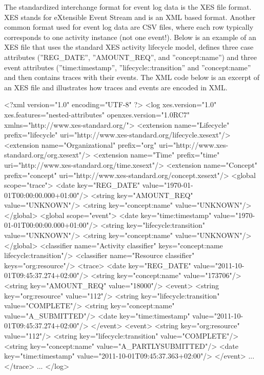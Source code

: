 The standardized interchange format for event log data is the XES file format. XES stands for eXtensible Event Stream and is an XML based format. Another common format used for event log data are CSV files, where each row typically corresponds to one activity instance (not one event!). Below is an example of an XES file that uses the standard XES activity lifecycle model, defines three case attributes (''REG\_DATE'', ''AMOUNT\_REQ'', and ''concept:name'') and three event attributes (''time:timestamp'', ''lifecycle::transition'' and ''concept:name'' and then contains traces with their events. The XML code below is an excerpt of an XES file and illustrates how traces and events are encoded in XML.

\begin{xmlcode}
<?xml version="1.0" encoding="UTF-8" ?>
<log xes.version="1.0" xes.features="nested-attributes" 
    openxes.version="1.0RC7" 
    xmlns="http://www.xes-standard.org/">
  <extension name="Lifecycle" prefix="lifecycle" 
    uri="http://www.xes-standard.org/lifecycle.xesext"/>
  <extension name="Organizational" prefix="org" 
    uri="http://www.xes-standard.org/org.xesext"/>
  <extension name="Time" prefix="time" 
    uri="http://www.xes-standard.org/time.xesext"/>
  <extension name="Concept" prefix="concept" 
    uri="http://www.xes-standard.org/concept.xesext"/>
  <global scope="trace">
    <date key="REG_DATE" value="1970-01-01T00:00:00.000+01:00"/>
    <string key="AMOUNT_REQ" value="UNKNOWN"/>
    <string key="concept:name" value="UNKNOWN"/>
  </global>
  <global scope="event">
    <date key="time:timestamp" value="1970-01-01T00:00:00.000+01:00"/>
    <string key="lifecycle:transition" value="UNKNOWN"/>
    <string key="concept:name" value="UNKNOWN"/>
  </global>
  <classifier name="Activity classifier" 
     keys="concept:name lifecycle:transition"/>
  <classifier name="Resource classifier" 
     keys="org:resource"/>
  <trace>
    <date key="REG_DATE" value="2011-10-01T09:45:37.274+02:00"/>
    <string key="concept:name" value="173706"/>
    <string key="AMOUNT_REQ" value="18000"/>
    <event>
      <string key="org:resource" value="112"/>
      <string key="lifecycle:transition" value="COMPLETE"/>
      <string key="concept:name" value="A_SUBMITTED"/>
      <date key="time:timestamp" value="2011-10-01T09:45:37.274+02:00"/>
    </event>
    <event>
      <string key="org:resource" value="112"/>
      <string key="lifecycle:transition" value="COMPLETE"/>
      <string key="concept:name" value="A_PARTLYSUBMITTED"/>
      <date key="time:timestamp" value="2011-10-01T09:45:37.363+02:00"/>
    </event>
    ...
  </trace>
  ...
</log>
\end{xmlcode}

